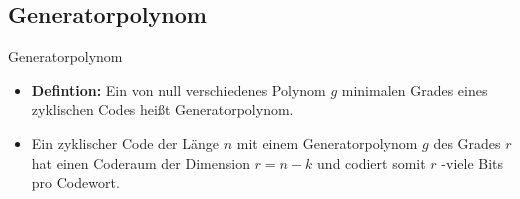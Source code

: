 \documentclass[11pt%
,aspectratio=169%
]{beamer}
\begin{document}
\subsection{Generatorpolynom}
\begin{frame}{Generatorpolynom}
	\begin{itemize}	
	\item \textbf{Defintion:} Ein von null verschiedenes Polynom $g$ minimalen Grades eines zyklischen Codes heißt Generatorpolynom.
	\item  Ein zyklischer Code der Länge $n$ mit einem Generatorpolynom $g$ des Grades $r$ hat einen Coderaum der Dimension $r=n-k$ und codiert somit $r$ -viele Bits pro Codewort.
	
	\end{itemize}
\end{frame}
 
 
\end{document}
